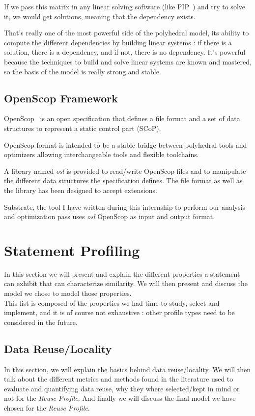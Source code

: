 \documentclass[paper=a4, fontsize=11.5pt]{scrartcl}
\numberwithin{equation}{section}        %
\numberwithin{figure}{section}          %
\numberwithin{table}{section}               %
\begin{document}
    If we pass this matrix in any linear solving software (like PIP~\cite{Fea88}) and try to solve it,
    we would get solutions, meaning that the dependency exists.

    \bigskip

    That's really one of the most powerful side of the polyhedral model, its ability to
    compute the different dependencies by building linear systems : if there is a solution,
    there is a dependency, and if not, there is no dependency. It's powerful because
    the techniques to build and solve linear systems are known and mastered, so the basis
    of the model is really strong and stable. 


    \subsection{OpenScop Framework}
        OpenScop~\cite{openscop} is an open specification that defines a file format
        and a set of data structures to represent a static control part (SCoP).

        OpenScop format is intended to be a stable bridge between polyhedral tools
        and optimizers allowing interchangeable tools and flexible toolchains.

        A library named \textit{osl} is provided to read/write OpenScop files
        and to manipulate the different data structures the specification defines.
        The file format as well as the library has been designed to accept extensions.

        Substrate, the tool I have written during this internship to perform our analysis
        and optimization pass uses \textit{osl} OpenScop as input and output format.

\section{Statement Profiling}
In this section we will present and explain the different properties a statement can exhibit
that can characterize similarity. We will then present and discuss the model we chose to model
those properties.\\
This list is composed of the properties we had time to study, select and implement,
and it is of course not exhaustive : other profile types need to be considered in the future.
\label{sec:statement_profiling}
    \subsection{Data Reuse/Locality}
        In this section, we will explain the basics behind data reuse/locality. We will then
        talk about the different metrics and methods found in the literature used to evaluate
        and quantifying data reuse, why they where selected/kept in mind or not for the \textit{Reuse Profile}.
        And finally we will discuss the final model we have chosen for the \textit{Reuse Profile}.
\end{document}
